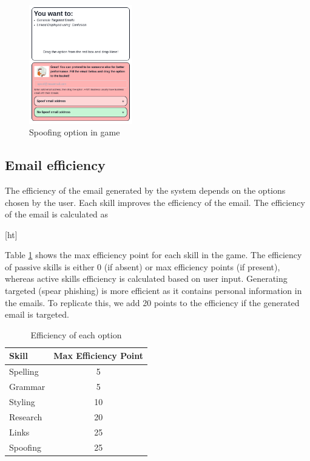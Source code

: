 \begin{figure}[ht]
    \centering
    \includegraphics[width=0.4\textwidth]{figures/section2/spoofing.png}
    \caption{Spoofing option in game}
    \label{fig:spoofing}
\end{figure}

\subsection{Email efficiency}
The efficiency of the email generated by the system depends on the options chosen by the user. Each skill improves the efficiency of the email. The efficiency of the email is calculated as

\begin{center}[ht]
\end{center}


Table \ref*{tab:efficiency} shows the max efficiency point for each skill in the game. The efficiency of passive skills is either 0 (if absent) or max efficiency points (if present), whereas active skills efficiency is calculated based on user input. Generating targeted (spear phishing) is more efficient as it contains personal information in the emails. To replicate this, we add 20 points to the efficiency if the generated email is targeted.

\begin{table}[ht]
    \centering
    \begin{tabular}{l c}
        Skill    & Max Efficiency Point \\
        \hline
        Spelling & 5                    \\
        Grammar  & 5                    \\
        Styling  & 10                   \\
        Research & 20                   \\
        Links    & 25                   \\
        Spoofing & 25                   \\
    \end{tabular}%
    \caption{Efficiency of each option}
    \label{tab:efficiency}
\end{table}

